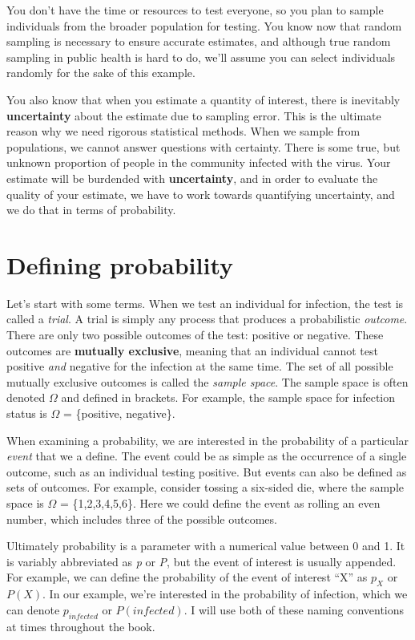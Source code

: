 \documentclass[
]{book}
\begin{document}
You don't have the time or resources to test everyone, so you plan to sample individuals from the broader population for testing. You know now that random sampling is necessary to ensure accurate estimates, and although true random sampling in public health is hard to do, we'll assume you can select individuals randomly for the sake of this example.

You also know that when you estimate a quantity of interest, there is inevitably \textbf{uncertainty} about the estimate due to sampling error. This is the ultimate reason why we need rigorous statistical methods. When we sample from populations, we cannot answer questions with certainty. There is some true, but unknown proportion of people in the community infected with the virus. Your estimate will be burdended with \textbf{uncertainty}, and in order to evaluate the quality of your estimate, we have to work towards quantifying uncertainty, and we do that in terms of probability.

\section{Defining probability}\label{defining-probability}

Let's start with some terms. When we test an individual for infection, the test is called a \emph{trial}. A trial is simply any process that produces a probabilistic \emph{outcome}. There are only two possible outcomes of the test: positive or negative. These outcomes are \textbf{mutually exclusive}, meaning that an individual cannot test positive \emph{and} negative for the infection at the same time. The set of all possible mutually exclusive outcomes is called the \emph{sample space}. The sample space is often denoted \(\Omega\) and defined in brackets. For example, the sample space for infection status is \(\Omega\) = \{positive, negative\}.

When examining a probability, we are interested in the probability of a particular \emph{event} that we a define. The event could be as simple as the occurrence of a single outcome, such as an individual testing positive. But events can also be defined as sets of outcomes. For example, consider tossing a six-sided die, where the sample space is \(\Omega\) = \{1,2,3,4,5,6\}. Here we could define the event as rolling an even number, which includes three of the possible outcomes.

Ultimately probability is a parameter with a numerical value between 0 and 1. It is variably abbreviated as \emph{p} or \emph{P}, but the event of interest is usually appended. For example, we can define the probability of the event of interest ``X'' as \(p_{X}\) or \(P(X)\). In our example, we're interested in the probability of infection, which we can denote \(p_{infected}\) or \(P(infected)\). I will use both of these naming conventions at times throughout the book.
\end{document}
